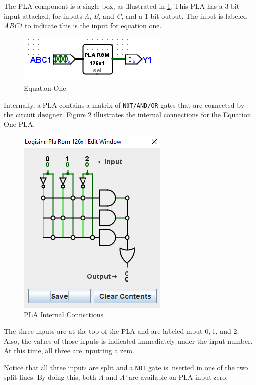 The \LE \ac{PLA} component is a single box, as illustrated in \ref{fig:pla-02}. This \ac{PLA} has a 3-bit input attached, for inputs \textit{A}, \textit{B}, and \textit{C}, and a 1-bit output. The input is labeled \textit{ABC1} to indicate this is the input for equation one. 

\begin{figure}[H]
	\centering
	\includegraphics[width=\maxwidth{.95\linewidth}]{gfx/pla-01}
	\caption{Equation One}
	\label{fig:pla-02}
\end{figure}

Internally, a \ac{PLA} contains a matrix of \texttt{NOT/AND/OR} gates that are connected by the circuit designer. Figure \ref{fig:pla-03} illustrates the internal connections for the Equation One \ac{PLA}.

\begin{figure}[H]
	\centering
	\includegraphics[width=\maxwidth{.95\linewidth}]{gfx/pla-02}
	\caption{PLA Internal Connections}
	\label{fig:pla-03}
\end{figure}

The three inputs are at the top of the \ac{PLA} and are labeled input 0, 1, and 2. Also, the values of those inputs is indicated immediately under the input number. At this time, all three are inputting a zero.

Notice that all three inputs are split and a \texttt{NOT} gate is inserted in one of the two split lines. By doing this, both \textit{A} and \textit{A'} are available on \ac{PLA} input zero. 

